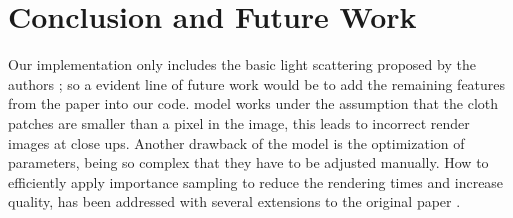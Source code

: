 \documentclass[12pt]{article}
\begin{document}
\FloatBarrier
\section{Conclusion and Future Work}

Our implementation only includes the basic light scattering proposed by the authors \cite{Sadeghi2013}; so a evident line of future work would be to add the remaining features from the paper into our code.
\citeauthor{Sadeghi2013} model works under the assumption that the cloth patches are smaller than a pixel in the image, this leads to incorrect render images at close ups.
Another drawback of the model is the optimization of parameters, being so complex that they have to be adjusted manually.
How to efficiently apply importance sampling to reduce the rendering times and increase quality, has been addressed with several extensions to the original paper \cite{Wang2014, Mizutani2014}.

\newpage


\end{document}
